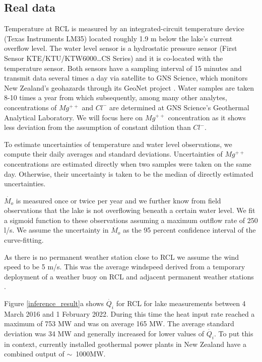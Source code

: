 \documentclass{bmcart}
\begin{document}
\subsection{Real data}\label{realdata}
Temperature at RCL is measured by an integrated-circuit temperature device
(Texas Instruments LM35) located roughly 1.9 m below the lake's current
overflow level. The water level sensor is a hydrostatic pressure sensor (First
Sensor KTE/KTU/KTW6000\ldots CS Series) and it is co-located with the
temperature sensor. Both sensors have a sampling interval of 15 minutes and
transmit data several times a day via satellite to GNS Science, which monitors
New Zealand's geohazards through its GeoNet project \cite{GeoNetHome}.
Water samples are taken 8-10 times a year from which subsequently, among many
other analytes, concentrations of $Mg^{++}$ and $Cl^-$ are determined at GNS
Science's Geothermal Analytical Laboratory. We will focus here on $Mg^{++}$
concentration as it shows less deviation from the assumption of constant
dilution than $Cl^-$.
 
To estimate uncertainties of temperature and water level observations, we 
compute their daily averages and standard deviations. Uncertainties of $Mg^{++}$
concentrations are estimated directly when two samples were taken on the same day.
Otherwise, their uncertainty is taken to be the median of directly estimated
uncertainties. 

$\dot{M_o}$ is measured once or twice per year and we further know from field
observations that the lake is not overflowing beneath a certain water level. We
fit a sigmoid function to these observations assuming a maximum outflow rate of
250 l/s. We assume the uncertainty in $\dot{M_o}$ as the 95 percent confidence
interval of the curve-fitting.

As there is no permanent weather station close to RCL we assume the wind speed
to be 5 m/s. This was the average windspeed derived from a temporary deployment
of a weather buoy on RCL and adjacent permanent weather stations
\cite{hurstUseWeatherBuoy2012}.

Figure \ref{inference_result}a shows $\dot{Q_i}$ for RCL for lake measurements
between 4 March 2016 and 1 February 2022. During this time the heat input rate
reached a maximum of 753 MW and was on average 165 MW. The average standard
deviation was 34 MW and generally increased for lower values of $\dot{Q_i}$. To
put this in context, currently installed geothermal power plants in New Zealand
have a combined output of $\sim$~1000MW.
\end{document}
